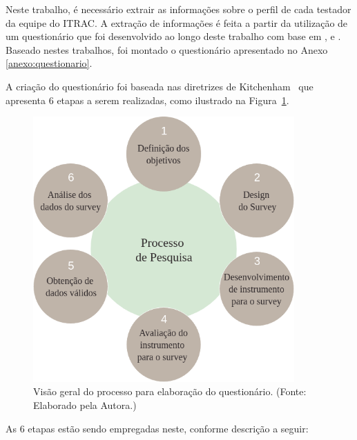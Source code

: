 Neste trabalho, é necessário extrair as informações sobre o perfil de cada testador da equipe do ITRAC. A extração de informações é feita a partir da utilização de um questionário que foi desenvolvido ao longo deste trabalho com base em \cite{Santos19SDPA}, \cite{geras2004survey} e \cite{groves2000survey}. Baseado nestes trabalhos, foi montado o questionário apresentado no Anexo \ref{anexo:questionario}.

A criação do questionário foi baseada nas  diretrizes de Kitchenham~\cite{kitchenham2008personal} que apresenta 6 etapas a serem realizadas, como ilustrado na Figura~\ref{fig:Abordagem}.

        \begin{figure}[h]
          \centering
          \includegraphics[width=10cm]{figuras/survey.png}
          \caption{Visão geral do processo para elaboração do questionário.  (Fonte: Elaborado pela Autora.)}
          \label{fig:Abordagem}

        \end{figure}

 As 6 etapas estão sendo empregadas neste, conforme descrição a seguir:

